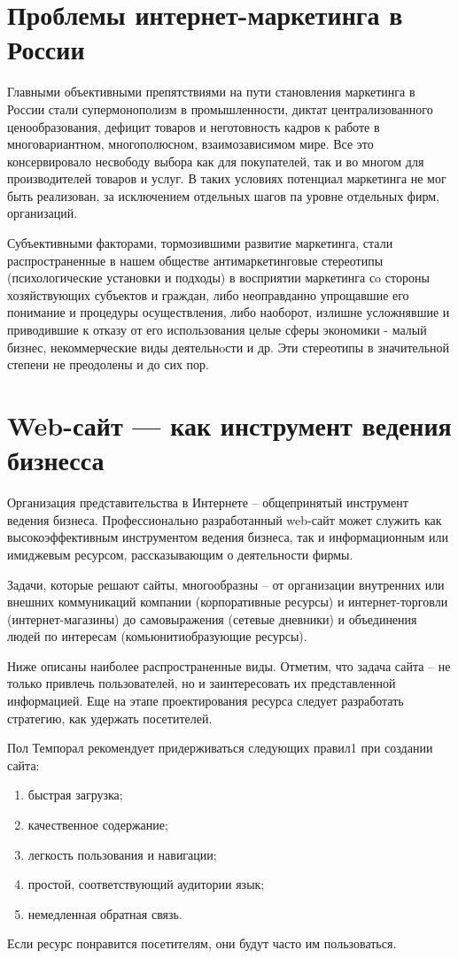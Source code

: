\documentclass[a4paper,english,russian]{G2-105}
\begin{document}
\section{Проблемы интернет-маркетинга в России}
\par Главными объективными препятствиями на пути становления маркетинга в России стали супермонополизм в промышленности, диктат централизованного ценообразования, дефицит товаров и неготовность кадров к работе в многовариантном, многополюсном, взаимозависимом мире. Все это консервировало несвободу выбора как для покупателей, так и во многом для производителей товаров и услуг. В таких условиях потенциал маркетинга не мог быть реализован, за исключением отдельных шагов па уровне отдельных фирм, организаций.
\par Субъективными факторами, тормозившими развитие маркетинга, стали распространенные в нашем обществе антимаркетинговые стереотипы (психологические установки и подходы) в восприятии маркетинга сo стороны хозяйствующих субъектов и граждан, либо неоправданно упрощавшие его понимание и процедуры осуществления, либо наоборот, излишне усложнявшие и приводившие к отказу от его использования целые сферы экономики - малый бизнес, некоммерческие виды деятельнoсти и др. Эти стереотипы в значительной степени не преодолены и до сих пор.
\section{Web-сайт --- как инструмент ведения бизнесса}
\par Организация представительства в Интернете – общепринятый инструмент ведения бизнеса. Профессионально разработанный web-сайт может служить как высокоэффективным инструментом ведения бизнеса, так и информационным или имиджевым ресурсом, рассказывающим о деятельности фирмы.
\par Задачи, которые решают сайты, многообразны – от организации внутренних или внешних коммуникаций компании (корпоративные ресурсы) и интернет-торговли (интернет-магазины) до самовыражения (сетевые дневники) и объединения людей по интересам (комьюнитиобразующие ресурсы).
\par Ниже описаны наиболее распространенные виды. Отметим, что задача сайта – не только привлечь пользователей, но и заинтересовать их представленной информацией. Еще на этапе проектирования ресурса следует разработать стратегию, как удержать посетителей.
\par Пол Темпорал рекомендует придерживаться следующих правил1 при создании сайта:
\begin{enumerate}
\item быстрая загрузка;
\item качественное содержание;
\item легкость пользования и навигации;
\item простой, соответствующий аудитории язык;
\item немедленная обратная связь.
\end{enumerate}
\par Если ресурс понравится посетителям, они будут часто им пользоваться.
\end{document}
